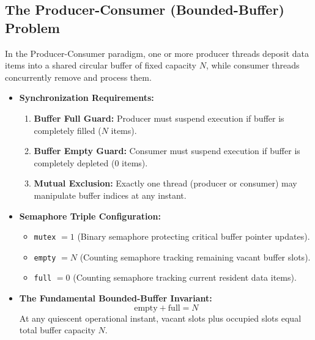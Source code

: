 \subsection{The Producer-Consumer (Bounded-Buffer) Problem}
In the Producer-Consumer paradigm, one or more producer threads deposit data items into a shared circular buffer of fixed capacity $N$, while consumer threads concurrently remove and process them.
\begin{itemize}
    \item \textbf{Synchronization Requirements:}
    \begin{enumerate}
        \item \textbf{Buffer Full Guard:} Producer must suspend execution if buffer is completely filled ($N$ items).
        \item \textbf{Buffer Empty Guard:} Consumer must suspend execution if buffer is completely depleted (0 items).
        \item \textbf{Mutual Exclusion:} Exactly one thread (producer or consumer) may manipulate buffer indices at any instant.
    \end{enumerate}
    \item \textbf{Semaphore Triple Configuration:}
    \begin{itemize}
        \item \texttt{mutex} $= 1$ (Binary semaphore protecting critical buffer pointer updates).
        \item \texttt{empty} $= N$ (Counting semaphore tracking remaining vacant buffer slots).
        \item \texttt{full} $= 0$ (Counting semaphore tracking current resident data items).
    \end{itemize}
    \item \textbf{The Fundamental Bounded-Buffer Invariant:}
    \begin{equation}
    \boxed{\text{empty} + \text{full} = N}
    \end{equation}
    At any quiescent operational instant, vacant slots plus occupied slots equal total buffer capacity $N$.
\end{itemize}

